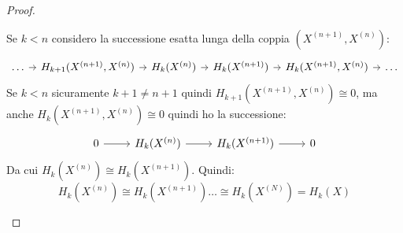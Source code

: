 \begin{proof}
\begin{enumerate}
    Se $ k < n $ considero la successione esatta lunga della coppia $ (X^{(n+1)}, X^{(n)}) $:
    \[
      \begin{tikzcd}[nodes={column sep=7pt}]
        \dots \rar & H_{k+1}(X^{(n+1)}, X^{(n)}) \rar & H_k(X^{(n)}) \rar & H_k(X^{(n+1)}) \rar & H_{k}(X^{(n+1)}, X^{(n)}) \rar & \dots
      \end{tikzcd}
    \]
    Se $ k < n $ sicuramente $ k + 1 \not = n + 1 $ quindi $ H_{k+1}(X^{(n+1)}, X^{(n)}) \cong 0 $,
    ma anche $ H_k(X^{(n+1)}, X^{(n)}) \cong 0 $
    quindi ho la successione:
    \[
      \begin{tikzcd}
       0\rar & H_k(X^{(n)}) \rar & H_k(X^{(n+1)}) \rar & 0
      \end{tikzcd}
    \]
    Da cui $ H_k(X^{(n)}) \cong H_k(X^{(n+1)}) $.
    Quindi:
    \[
      H_k(X^{(n)}) \cong H_k(X^{(n+1)}) \dots \cong H_k(X^{(N)}) = H_k(X)
    \]
  \end{enumerate}
\end{proof}

